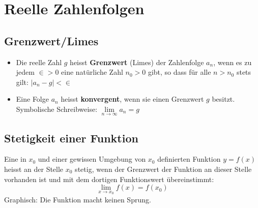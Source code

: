 
\section{Reelle Zahlenfolgen}
\subsection{Grenzwert/Limes}
\begin{itemize}
	\item Die reelle Zahl \(g\) heisst \textbf{Grenzwert} (Limes) der Zahlenfolge \(a_{n}\), wenn es zu jedem \(\in > 0\) eine natürliche Zahl \(n_{0} > 0\) gibt, so dass für alle \(n > n_{0}\) stets gilt: \(|a_{n}-g| < \in \)
	\item Eine Folge \(a_{n}\) heisst \textbf{konvergent}, wenn sie einen Grenzwert \(g\) besitzt.
	\newline Symbolische Schreibweise: \(\lim\limits_{n \rightarrow \infty}{a_n} = g \)
\end{itemize}

\subsection{Stetigkeit einer Funktion}
Eine in \(x_0\) und einer gewissen Umgebung von \(x_0\) definierten Funktion \(y=f(x)\) heisst an der Stelle \(x_0\) stetig, wenn der Grenzwert der Funktion an dieser Stelle vorhanden ist und mit dem dortigen Funktionswert übereinstimmt:
$$\lim\limits_{x \rightarrow x_0}{f(x)} = f(x_0)$$
Graphisch: Die Funktion macht keinen Sprung.

